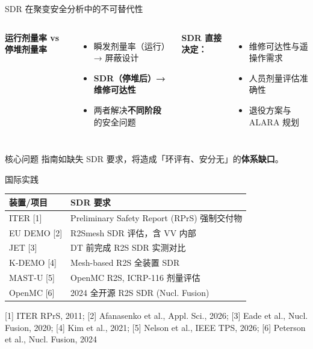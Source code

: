 \documentclass[aspectratio=169]{ctexbeamer}
\begin{document}
\begin{frame}{SDR 在聚变安全分析中的不可替代性}
	\begin{columns}[T]
		\textbf{运行剂量率 vs 停堆剂量率}
		\begin{itemize}
			\item 瞬发剂量率（运行）→ 屏蔽设计
			\item \textbf{SDR（停堆后）→ 维修可达性}
			\item 两者解决\textbf{不同阶段}的安全问题
		\end{itemize}

		\textbf{SDR 直接决定：}
		\begin{itemize}
			\item 维修可达性与遥操作需求
			\item 人员剂量评估准确性
			\item 退役方案与 ALARA 规划
		\end{itemize}
	\end{columns}

	\vspace{8pt}
	\begin{alertblock}{核心问题}
		指南如缺失 SDR 要求，将造成「环评有、安分无」的\textbf{体系缺口}。
	\end{alertblock}
\end{frame}

\begin{frame}{国际实践}
	\begin{table}
		\small
		\begin{tabular}{p{2.8cm} p{6.5cm}}
			\toprule
			\textbf{装置/项目} & \textbf{SDR 要求}                        \\
			\midrule
			ITER [1]       & Preliminary Safety Report (RPrS) 强制交付物 \\
			EU DEMO [2]    & R2Smesh SDR 评估，含 VV 内部                 \\
			JET [3]        & DT 前完成 R2S SDR 实测对比                    \\
			K-DEMO [4]     & Mesh-based R2S 全装置 SDR                 \\
			MAST-U [5]     & OpenMC R2S, ICRP-116 剂量评估              \\
			OpenMC [6]     & 2024 全开源 R2S SDR (Nucl. Fusion)        \\
			\bottomrule
		\end{tabular}
	\end{table}

	\vspace{6pt}
	{\footnotesize [1] ITER RPrS, 2011; [2] Afanasenko et al., Appl. Sci., 2026; [3] Eade et al., Nucl. Fusion, 2020; [4] Kim et al., 2021; [5] Nelson et al., IEEE TPS, 2026; [6] Peterson et al., Nucl. Fusion, 2024}
\end{frame}
\end{document}
